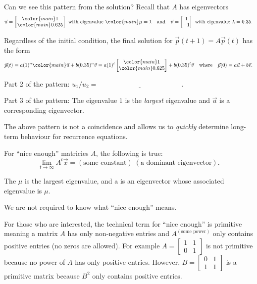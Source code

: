 \documentclass[../main.tex]{subfiles}
\begin{document}
Can we see this pattern from the solution? Recall that \(A\) has eigenvectors 
\[
  \vec{u} = \begin{bmatrix} {\color{main} 1} \\ {\color{main} 0.625} \end{bmatrix} \text{ with eigenvalue } {\color{main} \mu = 1}
  \quad\text{and}\quad
  \vec{v} = \begin{bmatrix}1 \\ -1 \end{bmatrix} \text{ with eigenvalue } \lambda = 0.35.
\]


Regardless of the initial condition, the final solution for \(\vec{p}(t+1) = A\vec{p}(t)\) has the form
\[
  \vec{p}(t) = a (1)^{n} {\color{main} \vec{u}} + b (0.35)^{n} \vec{v} = a (1)^{t}  \begin{bmatrix} {\color{main} 1} \\ {\color{main} 0.625} \end{bmatrix}+ b (0.35)^{t} \vec{v}
  \quad\text{where}\quad
  \vec{p}(0) = a \vec{u} + b \vec{v}.
\]

Part 2 of the pattern: \(u_{1} / u_{2} = \underline{\hspace{2in}}\).

Part 3 of the pattern: The eigenvalue \(1\) is the \emph{largest} eigenvalue and \(\vec{u}\) is a corresponding eigenvector.

\faStar{} The above pattern is not a coincidence and allows us to \emph{quickly} determine long-term behaviour for recurrence equations.

\begin{method}
  For ``nice enough'' matricies \(A\), the following is true:
  \[
    \lim_{t \to \infty} A^{t} \vec{x} = (\text{some constant}) \; (\text{a dominant eigenvector}).
  \]

  The  \(\mu\) is the largest eigenvalue, and a  is an eigenvector whose associated eigenvalue is \(\mu\).
\end{method}

\faExclamationTriangle{} We are not required to know what ``nice enough'' means. 

{\footnotesize For those who are interested, the technical term for ``nice enough'' is primitive meaning a matrix \(A\) has only non-negative entries and \(A^{(\text{some power})}\) only contains positive entries (no zeros are allowed).  For example \(A = \begin{bmatrix} 1 & 1 \\ 0 & 1\end{bmatrix}\) is not primitive because no power of \(A\) has only positive entries. However, \(B = \begin{bmatrix} 0 & 1 \\ 1 & 1\end{bmatrix}\) is a primitive matrix because \(B^{2}\) only contains positive entries.}
\end{document}
